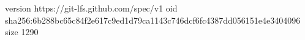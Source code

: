 version https://git-lfs.github.com/spec/v1
oid sha256:6b288bc65c84f2e617c9ed1d79ca1143c746dcf6fc4387dd056151e4e3404096
size 1290
